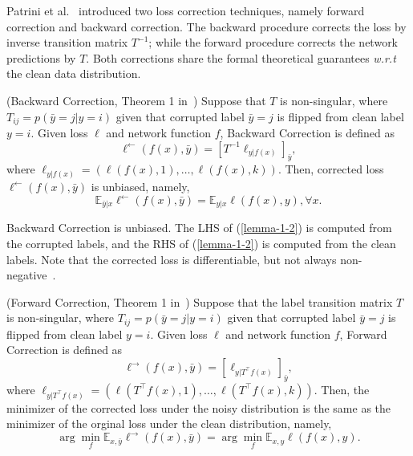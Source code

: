 \label{sec:bfcorr}
Patrini et al.~ introduced two loss correction techniques, namely forward correction and backward correction. 
The backward procedure corrects the loss by inverse transition matrix $T^{-1}$; 
while the forward procedure corrects the network predictions by $T$. 
Both corrections share the formal theoretical guarantees \textit{w.r.t} the clean data distribution.
\begin{theorem}
\label{bc-theorem} 
(Backward Correction, Theorem 1 in~) Suppose that $T$ is non-singular, where $T_{ij} = p(\bar{y} = j| y = i)$ given that corrupted label $\bar{y} = j$ is flipped from clean label $y = i$. Given loss $\ell$ and network function $f$, Backward Correction is defined as
\begin{equation}\label{lemma-1-1}
  \ell^{\leftarrow}(f(x),\bar{y}) = [T^{-1}\ell_{y|f(x)}]_{\bar{y}},
\end{equation}
where $\ell_{y|f(x)} = (\ell(f(x),1),\ldots,\ell(f(x),k))$. Then, corrected loss $\ell^{\leftarrow}(f(x),\bar{y})$ is unbiased, namely,
\begin{equation}\label{lemma-1-2}
  \mathbb{E}_{\bar{y}|x}\ell^{\leftarrow}(f(x),\bar{y}) = \mathbb{E}_{y|x}\ell(f(x), y), \forall x.
\end{equation}
\end{theorem}
\begin{remark}
Backward Correction is unbiased. The LHS of (\ref{lemma-1-2}) is computed from the corrupted labels, and the RHS of (\ref{lemma-1-2}) is computed from the clean labels. Note that the corrected loss is differentiable, but not always non-negative~.
\end{remark}
\begin{theorem}\label{fw-theorem} (Forward Correction, Theorem 1 in~) Suppose that the label
transition matrix $T$ is non-singular, where $T_{ij} = p(\bar{y} = j| y = i)$ given that corrupted label $\bar{y} = j$ is flipped from clean label $y = i$. Given loss $\ell$ and network function $f$, Forward Correction is defined as
\begin{equation}\label{lemma-2-1}
  \ell^{\rightarrow}(f(x), \bar{y}) = [\ell_{y|T^{\top}f(x)}]_{\bar{y}},
\end{equation}
where $\ell_{y|T^{\top}f(x)} = (\ell(T^{\top}f(x),1),\ldots,\ell(T^{\top}f(x),k))$. Then, the minimizer of the corrected loss under the noisy distribution is the same as the minimizer of the orginal loss under the clean distribution, namely,
\begin{equation}\label{lemma-2-2}
  \arg\min_f\mathbb{E}_{x,\bar{y}}\ell^{\rightarrow}(f(x), \bar{y}) = \arg\min_f\mathbb{E}_{x,y}\ell(f(x), y).
\end{equation}
\end{theorem}
